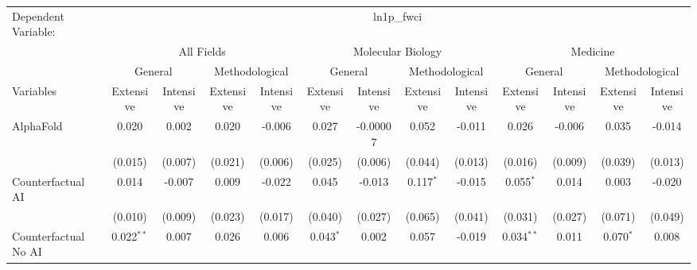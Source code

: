 \begingroup
\centering
\begin{tabular}{lcccccccccccc}
   \tabularnewline \midrule \midrule
   Dependent Variable: & \multicolumn{12}{c}{ln1p\_fwci}\\
 & \multicolumn{4}{c}{All Fields} & \multicolumn{4}{c}{Molecular Biology} & \multicolumn{4}{c}{Medicine} \\
\cmidrule(lr){2-5} \cmidrule(lr){6-9} \cmidrule(lr){10-13}
 & \multicolumn{2}{c}{General} & \multicolumn{2}{c}{Methodological} & \multicolumn{2}{c}{General} & \multicolumn{2}{c}{Methodological} & \multicolumn{2}{c}{General} & \multicolumn{2}{c}{Methodological} \\
\cmidrule(lr){2-3} \cmidrule(lr){4-5} \cmidrule(lr){6-7} \cmidrule(lr){8-9} \cmidrule(lr){10-11} \cmidrule(lr){12-13}
Variables & \multicolumn{1}{c}{Extensive} & \multicolumn{1}{c}{Intensive} & \multicolumn{1}{c}{Extensive} & \multicolumn{1}{c}{Intensive} & \multicolumn{1}{c}{Extensive} & \multicolumn{1}{c}{Intensive} & \multicolumn{1}{c}{Extensive} & \multicolumn{1}{c}{Intensive} & \multicolumn{1}{c}{Extensive} & \multicolumn{1}{c}{Intensive} & \multicolumn{1}{c}{Extensive} & \multicolumn{1}{c}{Intensive} \\
\cmidrule(lr){1-1}\cmidrule(lr){2-2} \cmidrule(lr){3-3} \cmidrule(lr){4-4} \cmidrule(lr){5-5} \cmidrule(lr){6-6} \cmidrule(lr){7-7} \cmidrule(lr){8-8} \cmidrule(lr){9-9} \cmidrule(lr){10-10} \cmidrule(lr){11-11} \cmidrule(lr){12-12} \cmidrule(lr){13-13}
   AlphaFold                                & 0.020        & 0.002   & 0.020   & -0.006  & 0.027        & -0.00007 & 0.052         & -0.011  & 0.026        & -0.006       & 0.035       & -0.014\\   
                                            & (0.015)      & (0.007) & (0.021) & (0.006) & (0.025)      & (0.006)  & (0.044)       & (0.013) & (0.016)      & (0.009)      & (0.039)     & (0.013)\\   
   Counterfactual AI                        & 0.014        & -0.007  & 0.009   & -0.022  & 0.045        & -0.013   & 0.117$^{*}$   & -0.015  & 0.055$^{*}$  & 0.014        & 0.003       & -0.020\\   
                                            & (0.010)      & (0.009) & (0.023) & (0.017) & (0.040)      & (0.027)  & (0.065)       & (0.041) & (0.031)      & (0.027)      & (0.071)     & (0.049)\\   
   Counterfactual No AI                     & 0.022$^{**}$ & 0.007   & 0.026   & 0.006   & 0.043$^{*}$  & 0.002    & 0.057         & -0.019  & 0.034$^{**}$ & 0.011        & 0.070$^{*}$ & 0.008\\   

\end{tabular}
